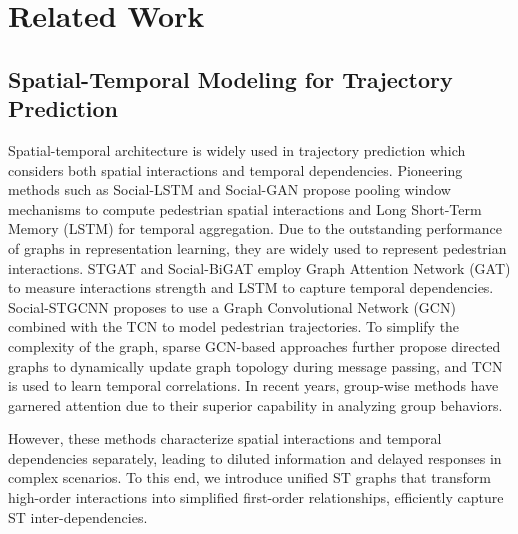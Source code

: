\section{Related Work}
\subsection{Spatial-Temporal Modeling for Trajectory Prediction}
Spatial-temporal architecture is widely used in trajectory prediction which considers both spatial interactions and temporal dependencies. Pioneering methods such as Social-LSTM \cite{Alexandre2016lstm} and Social-GAN \cite{gupta2018socialgan} propose pooling window mechanisms to compute pedestrian spatial interactions and Long Short-Term Memory (LSTM) \cite{HochSchm1997lstm} for temporal aggregation. Due to the outstanding performance of graphs in representation learning, they are widely used to represent pedestrian interactions. STGAT \cite{huang2019stgat} and Social-BiGAT \cite{kosaraju2019socialbigat} employ Graph Attention Network (GAT) \cite{petar2017GAT} to measure interactions strength and LSTM to capture temporal dependencies. Social-STGCNN \cite{Mohamed2020socialstgcnn} proposes to use a Graph Convolutional Network (GCN) \cite{kipf2016GCN} combined with the TCN \cite{bai2018TCN} to model pedestrian trajectories. To simplify the complexity of the graph, sparse GCN-based approaches \cite{shi2021sgcn, bae2023eigentrajectory, ruochen2022multiclassSGCN} further propose directed graphs to dynamically update graph topology during message passing, and TCN is used to learn temporal correlations. In recent years, group-wise methods \cite{Xu2022GroupNetMH, bae2022gpgraph} have garnered attention due to their superior capability in analyzing group behaviors. 

However, these methods characterize spatial interactions and temporal dependencies separately, leading to diluted information and delayed responses in complex scenarios. To this end, we introduce unified ST graphs that transform high-order interactions into simplified first-order relationships, efficiently capture ST inter-dependencies.

